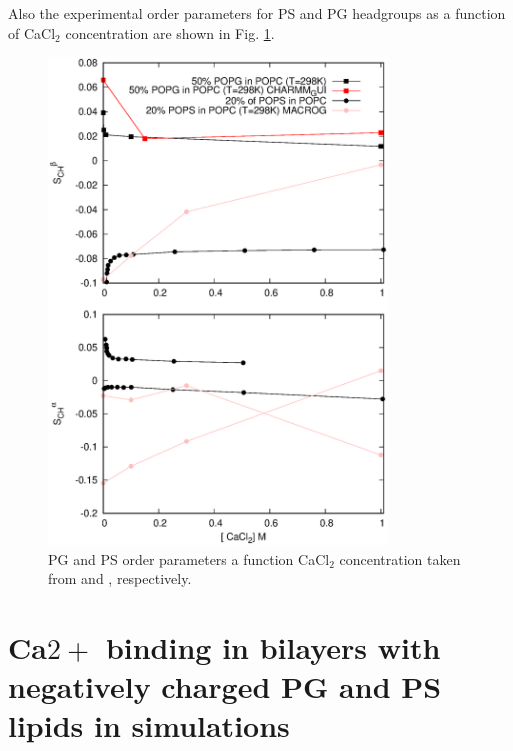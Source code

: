 \documentclass[aps,prl,superscriptaddress,twocolumn]{revtex4}
\begin{document}
Also the experimental order parameters for PS and PG headgroups
as a function of CaCl$_2$ concentration are shown in Fig. \ref{PSPGchangesWITHCaCl}.
\begin{figure}[]
  \centering
  \includegraphics[width=9.0cm]{../Figs/PSPGwithCaCl.eps}
  \caption{\label{PSPGchangesWITHCaCl}
    PG and PS order parameters a function CaCl$_2$ concentration taken from \cite{borle85} and \cite{roux90}, respectively.
  }
\end{figure}


\section{Ca$2+$ binding in bilayers with negatively charged PG and PS lipids in simulations}
\end{document}
